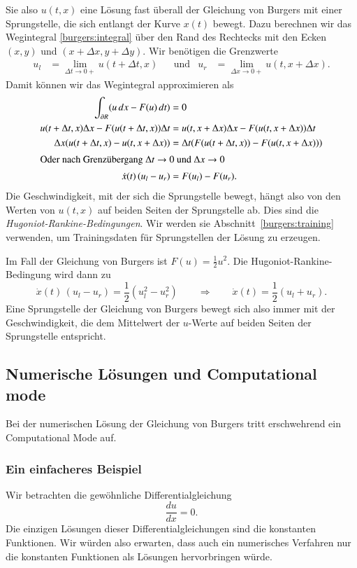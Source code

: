 Sie also $u(t,x)$ eine Lösung fast überall der Gleichung von Burgers mit
einer Sprungstelle, die sich entlangt der Kurve $x(t)$ bewegt.
Dazu berechnen wir das Wegintegral \eqref{burgers:integral} über den Rand
des Rechtecks mit den Ecken $(x,y)$ und $(x+\Delta x, y+\Delta y)$.
Wir benötigen die Grenzwerte
\[
\begin{aligned}
u_l &= \lim_{\Delta t\to 0+} u(t+\Delta t,x)
&&\text{und}&
u_r &= \lim_{\Delta x\to 0+} u(t,x+\Delta x).
\end{aligned}
\]
Damit können wir das Wegintegral approximieren als
\begin{align}
\int_{\partial R}(u\,dx -F(u)\,dt)
&=
0
\notag
\\
u(t+\Delta t,x)
\Delta x
-
F(u(t+\Delta t,x))
\Delta t
&=
u(t,x+\Delta x) \Delta x
-
F(u(t,x+\Delta x)) \Delta t
\notag
\\
\Delta x
(
u(t+\Delta t,x)
-
u(t,x+\Delta x)
)
&=
\Delta t
(F(u(t+\Delta t,x))
-
F(u(t,x+\Delta x))
)
\notag
\\
\intertext{Oder nach Grenzübergang $\Delta t\to 0$ und $\Delta x\to 0$}
\dot x(t)\, (u_l-u_r) &= F(u_l) - F(u_r).
\label{burgers:hugoniot-rankine}
\end{align}
Die Geschwindigkeit, mit der sich die Sprungstelle bewegt, hängt also 
von den Werten von $u(t,x)$ auf beiden Seiten der Sprungstelle ab.
Dies sind die {\em Hugoniot-Rankine-Bedingungen}.
Wir werden sie Abschnitt~\ref{burgers:training} verwenden, um Trainingsdaten
für Sprungstellen der Lösung zu erzeugen.

Im Fall der Gleichung von Burgers ist $F(u)=\frac12u^2$.
Die Hugoniot-Rankine-Bedingung wird dann zu
\begin{equation}
\dot x(t)\, (u_l-u_r) = \frac12 (u_l^2-u_r^2)
\qquad\Rightarrow\qquad
\dot x(t)
=
\frac12 (u_l+u_r).
\end{equation}
Eine Sprungstelle der Gleichung von Burgers bewegt sich also immer
mit der Geschwindigkeit, die dem Mittelwert der $u$-Werte auf
beiden Seiten der Sprungstelle entspricht.

\subsection{Numerische Lösungen und Computational mode}
Bei der numerischen Lösung der Gleichung von Burgers tritt erschwehrend ein
Computational Mode auf.

\subsubsection{Ein einfacheres Beispiel}
Wir betrachten die gewöhnliche Differentialgleichung
\begin{equation}
\frac{du}{dx}=0.
\label{burgers:konstant}
\end{equation}
Die einzigen Lösungen dieser Differentialgleichungen sind die konstanten
Funktionen.
Wir würden also erwarten, dass auch ein numerisches Verfahren nur
die konstanten Funktionen als Lösungen hervorbringen würde.

